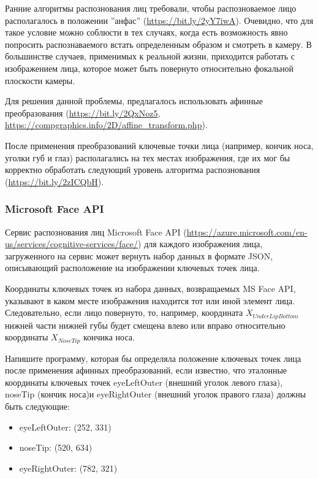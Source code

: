 
Ранние алгоритмы распознования лиц требовали, чтобы распозноваемое лицо располагалось в положении ''анфас'' (\url{https://bit.ly/2yY7iwA}). 
Очевидно, что для такое условие можно соблюсти в тех случаях, когда есть возможность явно попросить 
распознаваемого встать определенным образом и смотреть в камеру. В большинстве случаев, применимых к реальной 
жизни, приходится работать с изображением лица, которое может быть повернуто относительно фокальной плоскости 
камеры.

Для решения данной проблемы, предлагалось использовать афинные преобразования (\url{https://bit.ly/2QxNoz5}, 
\url{https://compgraphics.info/2D/affine_transform.php}).

После применения преобразований ключевые точки лица (например, кончик носа, уголки губ и глаз) 
располагались на тех местах изображения, где их мог бы корректно обработать следующий уровень 
алгоритма распознования (\url{https://bit.ly/2zICQbH}).

\subsubsection*{Microsoft Face API}

Сервис распознования лиц Microsoft Face API (\url{https://azure.microsoft.com/en-us/services/cognitive-services/face/}) для каждого изображения лица, 
загруженного на сервис может вернуть набор данных в формате JSON, описывающий расположение на изображении 
ключевых точек лица.


Координаты ключевых точек из набора данных, возвращаемых MS Face API, 
указывают в каком месте изображения находится тот или иной элемент лица. Следовательно, если лицо повернуто, то, 
например, координата $X_{UnderLipBottom}$ нижней части нижней губы будет смещена влево или вправо относительно 
координаты $X_{NoseTip}$ кончика носа.

Напишите программу, которая бы определяла положение ключевых 
точек лица после применения афинных преобразований, если известно, что эталонные координаты ключевых точек 
eyeLeftOuter (внешний уголок левого глаза), noseTip (кончик носа)и eyeRightOuter 
(внешний уголок правого глаза) должны быть следующие:

\begin{itemize}
    \item eyeLeftOuter: (252, 331)
    \item noseTip: (520, 634)
    \item eyeRightOuter: (782, 321)
\end{itemize}

